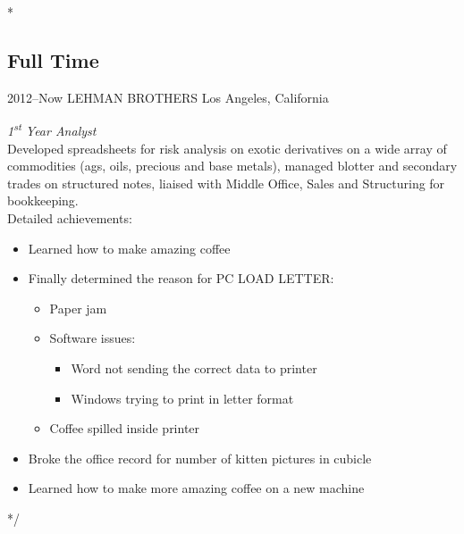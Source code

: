 \documentclass[]{friggeri-cv} %
\begin{document}
\/*

\subsection{Full Time}

\begin{entrylist}

	\entry
	{2012--Now}
	{LEHMAN BROTHERS}
	{Los Angeles, California}
	{\emph{1\textsuperscript{st} Year Analyst} \\
		Developed spreadsheets for risk analysis on exotic derivatives on a wide array of commodities (ags, oils, precious and base metals), managed blotter and secondary trades on structured notes, liaised with Middle Office, Sales and Structuring for bookkeeping. \\
		Detailed achievements:
		\begin{itemize}
			\item Learned how to make amazing coffee
			\item Finally determined the reason for \textsc{PC LOAD LETTER}:
				\begin{itemize}
					\item Paper jam
					\item Software issues:
						\begin{itemize}
							\item Word not sending the correct data to printer
							\item Windows trying to print in letter format
						\end{itemize}
					\item Coffee spilled inside printer
				\end{itemize}
			\item Broke the office record for number of kitten pictures in cubicle
			\item Learned how to make more amazing coffee on a new machine
		\end{itemize}}

\end{entrylist}
*/

\end{document}
